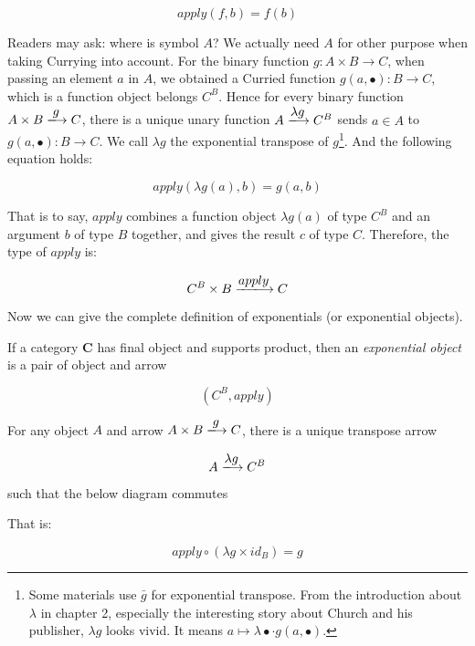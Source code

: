 \documentclass{article}
\begin{document}
\[
apply(f, b) = f(b)
\]

Readers may ask: where is symbol $A$? We actually need $A$ for other purpose when taking Currying into account. For the binary function $g: A \times B \to C$, when passing an element $a$ in $A$, we obtained a Curried function $g(a, \bullet) : B \to C$, which is a function object belongs $C^B$. Hence for every binary function $A \times B \arrowto{g} C$, there is a unique unary function $A \arrowto{\lambda g} C^B$ sends $a \in A$ to $g(a, \bullet) : B \to C$. We call $\lambda g$ the exponential transpose of $g$\footnote{Some materials use $\bar{g}$ for exponential transpose. From the introduction about $\lambda$ in chapter 2, especially the interesting story about Church and his publisher, $\lambda g$ looks vivid. It means $a \mapsto \lambda \bullet \cdot g(a, \bullet)$.}. And the following equation holds:

\[
apply(\lambda g(a), b) = g(a, b)
\]

That is to say, $apply$ combines a function object $\lambda g(a)$ of type $C^B$ and an argument $b$ of type $B$ together, and gives the result $c$ of type $C$. Therefore, the type of $apply$ is:

\[
C^B \times B \arrowto{apply} C
\]

 
Now we can give the complete definition of exponentials (or exponential objects).

\begin{definition}
\normalfont
If a category $\pmb{C}$ has final object and supports product, then an {\em exponential object} is a pair of object and arrow

\[
(C^B, apply)
\]

For any object $A$ and arrow $A \times B \arrowto{g} C$, there is a unique transpose arrow

\[
 A \arrowto{\lambda g} C^B
\]

such that the below diagram commutes

\begin{center}
\end{center}

That is:

\[
  apply \circ (\lambda g \times id_B) = g
\]

\end{definition}
\end{document}
